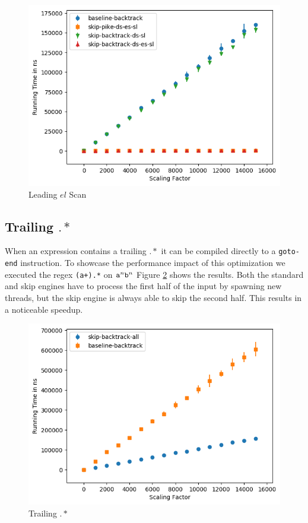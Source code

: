 \begin{figure}
\caption{Leading $el$ Scan}
\label{fig:leading:noncontaining:estar}

\includegraphics{resources/leading-noncontaining-estar.png}
\end{figure}

\subsection{Trailing $.*$}

When an expression contains a trailing $.*$ it can be compiled
directly to a \verb'goto-end' instruction. To showcase the
performance impact of this optimization we executed the
regex \verb'(a+).*' on ${\tt a}^n{\tt b}^n$
Figure \ref{fig:aplus:trailing} shows the results. Both the standard
and skip engines have to process the first half of the input
by spawning new threads, but the skip engine is always able
to skip the second half. This results in a noticeable speedup.

\begin{figure}
\caption{Trailing $.*$}
\label{fig:aplus:trailing}

\includegraphics{resources/aplus-trailing.png}
\end{figure}

